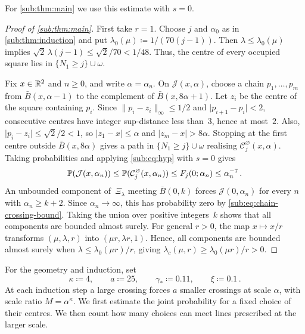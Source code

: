 \documentclass[11pt,letterpaper]{article}
\newcommand{\cC}{\mathcal C}
\begin{document}
For \cref{sub:thm:main} we use this estimate with $s=0$.

\begin{proof}[Proof of \cref{sub:thm:main}]
First take $r=1$. Choose $j$ and $\alpha_0$ as in \cref{sub:thm:induction} and put $\lambda_0(\mu)\coloneqq1/(70(j-1))$. Then $\lambda\le\lambda_0(\mu)$ implies $\sqrt2\,\lambda(j-1)\le\sqrt2/70<1/48$. Thus, the centre of every occupied square lies in $\{N_1\ge j\}\cup\omega$.

Fix $x\in\mathbb R^2$ and $n\ge0$, and write $\alpha=\alpha_n$. On $\mathcal J(x,\alpha)$, choose a chain $p_1,\dots,p_m$ from $\bar B(x,\alpha-1)$ to the complement of $\bar B(x,8\alpha+1)$. Let $z_i$ be the centre of the square containing $p_i$. Since $\lVert p_i-z_i\rVert_\infty\le1/2$ and $\lvert p_{i+1}-p_i\rvert<2$, consecutive centres have integer sup-distance less than~$3$, hence at most~$2$. Also, $\lvert p_i-z_i\rvert\le\sqrt2/2<1$, so $\lvert z_1-x\rvert\le\alpha$ and $\lvert z_m-x\rvert>8\alpha$. Stopping at the first centre outside $\bar B(x,8\alpha)$ gives a path in $\{N_1\ge j\}\cup\omega$ realising $\cC_j^\varnothing(x,\alpha)$. Taking probabilities and applying \eqref{sub:eq:hyp} with $s=0$ gives
\begin{equation}
\label{sub:eq:chain-crossing-bound}
  \P(\mathcal J(x,\alpha_n))
  \le \P(\cC_j^\varnothing(x,\alpha_n))
  \le F_j(0;\alpha_n)
  \le\alpha_n^{-7}\,.
\end{equation}
An unbounded component of~$\Xi_\lambda$ meeting $\bar B(0,k)$ forces $\mathcal J(0,\alpha_n)$ for every $n$ with $\alpha_n\ge k+2$. Since $\alpha_n\to\infty$, this has probability zero by \eqref{sub:eq:chain-crossing-bound}. Taking the union over positive integers~$k$ shows that all components are bounded almost surely. For general $r>0$, the map $x\mapsto x/r$ transforms $(\mu,\lambda,r)$ into $(\mu r,\lambda r,1)$. Hence, all components are bounded almost surely when $\lambda\le\lambda_0(\mu r)/r$, giving $\lambda_c(\mu,r)\ge\lambda_0(\mu r)/r>0$.
\end{proof}

For the geometry and induction, set
\begin{equation}
\label{sub:eq:param}
  \kappa\coloneqq4,\qquad a\coloneqq25,\qquad\gamma_*\coloneqq0.11,
  \qquad\xi\coloneqq0.1\,.
\end{equation}
At each induction step a large crossing forces $a$ smaller crossings at scale $\alpha$, with scale ratio $M=\alpha^\kappa$. We first estimate the joint probability for a fixed choice of their centres. We then count how many choices can meet lines prescribed at the larger scale.
\end{document}
